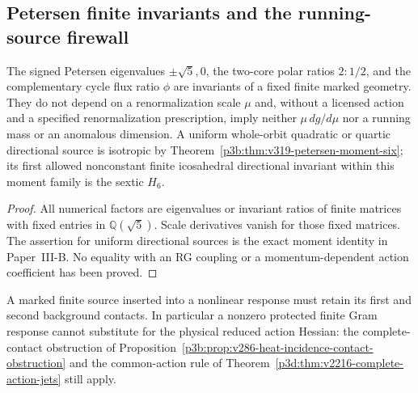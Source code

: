 \documentclass[12pt,a4paper]{article}
\begin{document}
\subsection{Petersen finite invariants and the running-source firewall}
\label{p3d:sec:v319-petersen-running}
\begin{proposition}
\label{p3d:prop:v319-petersen-no-running}
The signed Petersen eigenvalues $\pm\sqrt5,0$, the two-core polar
ratios $2:1/2$, and the complementary cycle flux ratio $\phi$
are invariants of a fixed finite marked geometry.  They do not depend
on a renormalization scale $\mu$ and, without a licensed action and a
specified renormalization prescription, imply neither
$\mu\,d g/d\mu$ nor a running mass or an anomalous dimension.
A uniform whole-orbit quadratic or quartic directional source is
isotropic by Theorem~\ref{p3b:thm:v319-petersen-moment-six}; its
first allowed nonconstant finite icosahedral directional invariant
within this moment family is the sextic $H_6$.
\end{proposition}
\begin{proof}
All numerical factors are eigenvalues or invariant ratios of finite
matrices with fixed entries in $\mathbb Q(\sqrt5)$.  Scale
derivatives vanish for those fixed matrices.  The assertion for
uniform directional sources is the exact moment identity in Paper~III-B.
No equality with an RG coupling or a momentum-dependent action
coefficient has been proved.
\end{proof}
\begin{remark}
A marked finite source inserted into a nonlinear response must retain
its first and second background contacts.  In particular a nonzero
protected finite Gram response cannot substitute for the physical
reduced action Hessian: the complete-contact obstruction of
Proposition~\ref{p3b:prop:v286-heat-incidence-contact-obstruction}
and the common-action rule of
Theorem~\ref{p3d:thm:v2216-complete-action-jets} still apply.
\end{remark}
\end{document}
